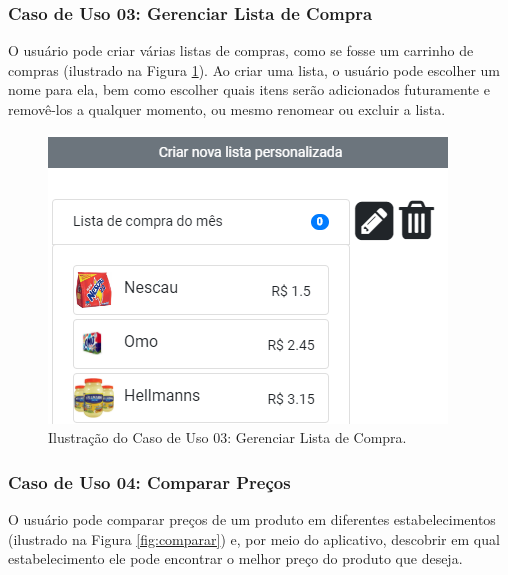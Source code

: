 \subsubsection{Caso de Uso 03: Gerenciar Lista de Compra}

O usuário pode criar várias listas de compras, como se fosse um carrinho de compras (ilustrado na Figura \ref{fig:lista}). Ao criar uma lista, o usuário pode escolher um nome para ela, bem como escolher quais itens serão adicionados futuramente e removê-los a qualquer momento, ou mesmo renomear ou excluir a lista.

\begin{figure}[H]
\centering
\includegraphics[width=\linewidth]{figuras/tela_lista_personalizada.png}
\caption{Ilustração do Caso de Uso 03: Gerenciar Lista de Compra.}
\label{fig:lista}
\end{figure}

\subsubsection{Caso de Uso 04: Comparar Preços}

O usuário pode comparar preços de um produto em diferentes estabelecimentos (ilustrado na Figura  \ref{fig:comparar}) e, por meio do aplicativo, descobrir em qual estabelecimento ele pode encontrar o melhor preço do produto que deseja.

